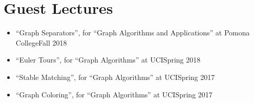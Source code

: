 \documentclass[letterpaper,10pt,oneside]{article}
\begin{document}
\begin{comment}
\section*{Teaching Experience}
\subsection*{Teaching Assistant at University of California, Irvine, USA}
\begin{itemize}
    \item Graph Algorithms \hfill Spring 2017, Spring 2018
    \item Formal Languages and Automata Theory \hfill Winter 2018
    \item Design and Analysis of Algorithms \hfill Fall 2016, Winter 2017
\end{itemize}
\end{comment}
\section*{Guest Lectures}
\begin{itemize}
	\item ``Graph Separators'', for ``Graph Algorithms and Applications'' at Pomona College\hfill Fall 2018
	\item ``Euler Tours'', for ``Graph Algorithms'' at UCI\hfill Spring 2018
	\item ``Stable Matching'', for ``Graph Algorithms'' at UCI\hfill Spring 2017
	\item ``Graph Coloring'',  for ``Graph Algorithms'' at UCI\hfill Spring 2017
\end{itemize}
\end{document}
